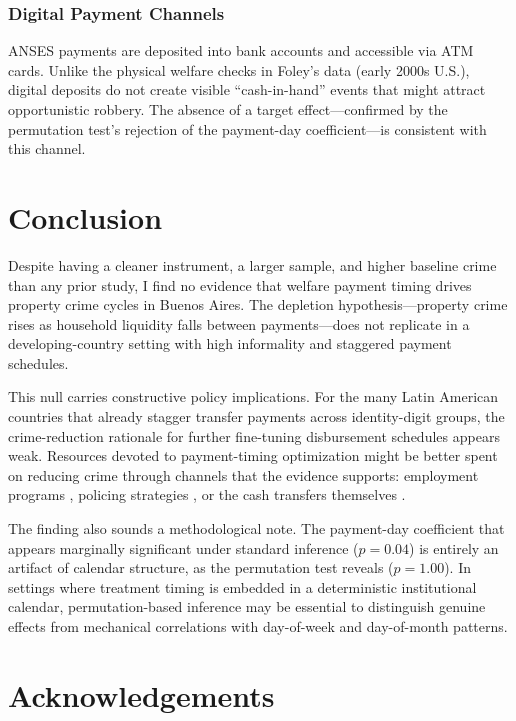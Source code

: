 \documentclass[12pt]{article}
\begin{document}
\subsubsection*{Digital Payment Channels} ANSES payments are deposited into bank accounts and accessible via ATM cards. Unlike the physical welfare checks in Foley's data (early 2000s U.S.), digital deposits do not create visible ``cash-in-hand'' events that might attract opportunistic robbery. The absence of a target effect---confirmed by the permutation test's rejection of the payment-day coefficient---is consistent with this channel.


\section{Conclusion}
\label{sec:conclusion}

Despite having a cleaner instrument, a larger sample, and higher baseline crime than any prior study, I find no evidence that welfare payment timing drives property crime cycles in Buenos Aires. The depletion hypothesis---property crime rises as household liquidity falls between payments---does not replicate in a developing-country setting with high informality and staggered payment schedules.

This null carries constructive policy implications. For the many Latin American countries that already stagger transfer payments across identity-digit groups, the crime-reduction rationale for further fine-tuning disbursement schedules appears weak. Resources devoted to payment-timing optimization might be better spent on reducing crime through channels that the evidence supports: employment programs \citep{heller2017}, policing strategies \citep{di2004}, or the cash transfers themselves \citep{bharadwaj2020}.

The finding also sounds a methodological note. The payment-day coefficient that appears marginally significant under standard inference ($p = 0.04$) is entirely an artifact of calendar structure, as the permutation test reveals ($p = 1.00$). In settings where treatment timing is embedded in a deterministic institutional calendar, permutation-based inference may be essential to distinguish genuine effects from mechanical correlations with day-of-week and day-of-month patterns.

\section*{Acknowledgements}
\end{document}
